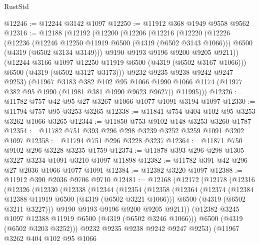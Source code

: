 \begin{lexlean}{RustStd}
\begin{coremodule}
@12246 := @12244 @3142 @1097
@12250 := @11912 @368 @1949 @9558 @9562
@12316 := @12188
    (@12192
      (@12200
        (@12206
          (@12216
            (@12220
              (@12226
                (@12236
                  (@12246 @12250 @11919 @6500 (@4319 (@6502 @3143 @1066)))
                  @6500
                  (@4319 (@6502 @3134 @3149)))
                @9190
                @9193
                @9196
                @9200
                @9205
                @9211))
            (@12244 @3166 @1097 @12250 @11919 @6500 (@4319 (@6502 @3167 @1066)))
            @6500
            (@4319 (@6502 @3127 @3173)))
          @9232
          @9235
          @9238
          @9242
          @9247
          @9253)
        (@11967
          @3183
          @382
          @102
          @95
          @1066
          @1990
          @1066
          @1174
          (@11977 @382 @95 @1990 (@11981 @381 @1990 @9623 @9627))
          @11995)))
@12326 := @11782 @757 @42 @95 @27 @3267 @1066 @1077 @1091 @3194 @1097
@12330 := @11794 @757 @95 @3253 @3265
@12338 := @11841 @754 @404 @102 @95 @3253 @3262 @1066 @3265
@12344 := @11850 @753 @9102 @148 @3253 @3260 @1787
@12354 := @11782 @751 @393 @296 @298 @3239 @3252 @3259 @1091 @3202 @1097
@12358 := @11794 @751 @296 @3228 @3237
@12364 := @11871 @750 @9102 @296 @3228 @3235 @1759
@12374 := @11878 @393 @296 @298 @1305 @3227 @3234 @1091 @3210 @1097 @11898
@12382 := @11782 @391 @42 @296 @27 @2036 @1066 @1077 @1091
@12384 := @12382 @3220 @1097
@12388 := @11912 @390 @2036 @9706 @9710
@12481 := @12168
    (@12172
      (@12178
        (@12316
          (@12326
            (@12330
              (@12338
                (@12344
                  (@12354
                    (@12358
                      (@12364
                        (@12374
                          (@12384 @12388 @11919 @6500 (@4319 (@6502 @3221 @1066)))
                          @6500
                          (@4319 (@6502 @3211 @3227)))
                        @9190
                        @9193
                        @9196
                        @9200
                        @9205
                        @9211))
                    (@12382 @3245 @1097 @12388 @11919 @6500 (@4319 (@6502 @3246 @1066)))
                    @6500
                    (@4319 (@6502 @3203 @3252)))
                  @9232
                  @9235
                  @9238
                  @9242
                  @9247
                  @9253)
                (@11967
                  @3262
                  @404
                  @102
                  @95
                  @1066

\end{coremodule}
\end{lexlean}
